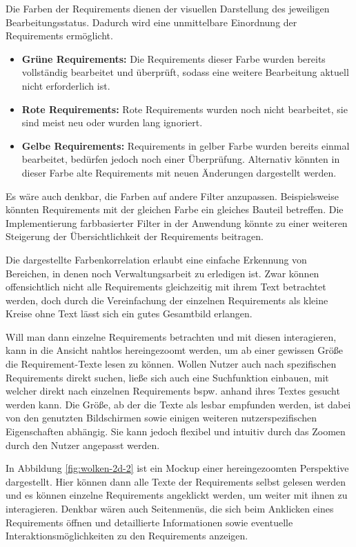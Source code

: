 \newpage

Die Farben der Requirements dienen der visuellen Darstellung des jeweiligen Bearbeitungsstatus.
Dadurch wird eine unmittelbare Einordnung der Requirements ermöglicht.
\begin{itemize}
    \item \textbf{Grüne Requirements:} Die Requirements dieser Farbe wurden bereits vollständig bearbeitet und überprüft, sodass eine weitere Bearbeitung aktuell nicht erforderlich ist.
    \item \textbf{Rote Requirements:} Rote Requirements wurden noch nicht bearbeitet, sie sind meist neu oder wurden lang ignoriert.
    \item \textbf{Gelbe Requirements:} Requirements in gelber Farbe wurden bereits einmal bearbeitet, bedürfen jedoch noch einer Überprüfung. Alternativ könnten in dieser Farbe alte Requirements mit neuen Änderungen dargestellt werden.
\end{itemize}
Es wäre auch denkbar, die Farben auf andere Filter anzupassen.
Beispielsweise könnten Requirements mit der gleichen Farbe ein gleiches Bauteil betreffen.
Die Implementierung farbbasierter Filter in der Anwendung könnte zu einer weiteren Steigerung der Übersichtlichkeit der Requirements beitragen.

Die dargestellte Farbenkorrelation erlaubt eine einfache Erkennung von Bereichen, in denen noch Verwaltungsarbeit zu erledigen ist.
Zwar können offensichtlich nicht alle Requirements gleichzeitig mit ihrem Text betrachtet werden, doch durch die Vereinfachung der einzelnen Requirements als kleine Kreise ohne Text lässt sich ein gutes Gesamtbild erlangen.


Will man dann einzelne Requirements betrachten und mit diesen interagieren, kann in die Ansicht nahtlos hereingezoomt werden, um ab einer gewissen Größe die Requirement-Texte lesen zu können.
Wollen Nutzer auch nach spezifischen Requirements direkt suchen, ließe sich auch eine Suchfunktion einbauen, mit welcher direkt nach einzelnen Requirements bspw. anhand ihres Textes gesucht werden kann.
Die Größe, ab der die Texte als lesbar empfunden werden, ist dabei von den genutzten Bildschirmen sowie einigen weiteren nutzerspezifischen Eigenschaften abhängig.
Sie kann jedoch flexibel und intuitiv durch das Zoomen durch den Nutzer angepasst werden.

\newpage

In Abbildung \ref{fig:wolken-2d-2} ist ein Mockup einer hereingezoomten Perspektive dargestellt.
Hier können dann alle Texte der Requirements selbst gelesen werden und es können einzelne Requirements angeklickt werden, um weiter mit ihnen zu interagieren.
Denkbar wären auch Seitenmenüs, die sich beim Anklicken eines Requirements öffnen und detaillierte Informationen sowie eventuelle Interaktionsmöglichkeiten zu den Requirements anzeigen. 


